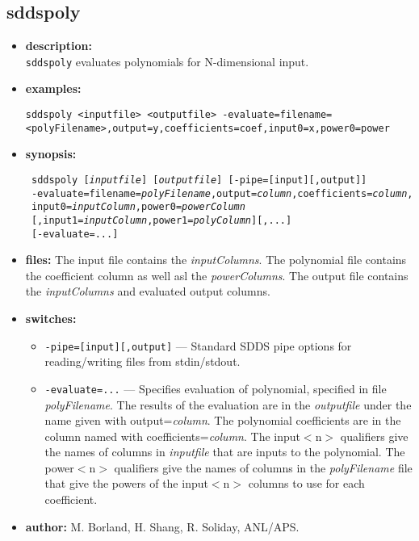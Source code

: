 \newpage 
\subsection{sddspoly} 
\label{sddspoly} 
 
\begin{itemize} 
\item {\bf description:} \hspace*{1mm}\\ 
{\tt sddspoly} evaluates polynomials for N-dimensional input.
\item {\bf examples:} 
\begin{flushleft}
{\tt sddspoly <inputfile> <outputfile> -evaluate=filename=<polyFilename>,output=y,coefficients=coef,input0=x,power0=power }
\end{flushleft} 
\item {\bf synopsis:}  
\begin{flushleft}
{\tt 
sddspoly [{\em inputfile}] [{\em outputfile}] [-pipe=[input][,output]] \\ \
-evaluate=filename={\em polyFilename},output={\em column},coefficients={\em column}, \\ \
input0={\em inputColumn},power0={\em powerColumn} \\ \
{}[,input1={\em inputColumn},power1={\em polyColumn}][,...] \\ \
{}[-evaluate=...]}
\end{flushleft} 
\item {\bf files:} 
The input file contains the {\em inputColumns}. The polynomial file contains the coefficient column as well asl the {\em powerColumns}. The output file contains the {\em inputColumns} and evaluated output columns.
\item {\bf switches:} 
    \begin{itemize} 
    \item {\tt -pipe=[input][,output]} --- Standard SDDS pipe options for reading/writing files from stdin/stdout.
    \item {\tt -evaluate=...} --- Specifies evaluation of polynomial, specified in file {\em polyFilename}.  The results of the evaluation are in the {\em outputfile} under the name given with output={\em column}. The polynomial coefficients are in the column named with coefficients={\em column}.  The input$<$n$>$ qualifiers give the names of columns in {\em inputfile} that are inputs to the polynomial.  The power$<$n$>$ qualifiers give the names of columns in the {\em polyFilename} file that give the powers of the input$<$n$>$ columns to use for each coefficient.
\end{itemize} 

\item {\bf author:} M. Borland, H. Shang, R. Soliday, ANL/APS. 
\end{itemize} 
